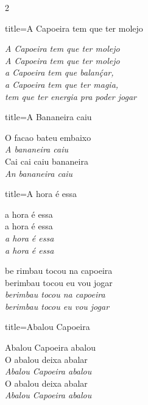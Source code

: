 \documentclass[fontsize=14pt, paper=a4, twoside, DIV=20]{scrreprt} %
\begin{document}
\begin{multicols*}{2}
\begin{song}{title={A Capoeira tem que ter molejo}}
\begin{verse*}
    \textit{A Capoeira tem que ter molejo \\
    A Capoeira tem que ter molejo \\
    a Capoeira tem que balanḉar, \\
    a Capoeira tem que ter magia, \\
    tem que ter energia pra poder jogar \\}
\end{verse*}
\end{song}

\columnbreak
\begin{song}{title={A Bananeira caiu}}
\begin{verse*}
O facao bateu embaixo\\
\textit{A bananeira caiu} \\
Cai cai caiu bananeira \\
\textit{An bananeira caiu} \\
\end{verse*}
\end{song}
\columnbreak
\begin{song}{title={A hora é essa}}
    \begin{verse*}
        a hora é essa \\
        a hora é essa \\
        \textit{
            a hora é essa \\
            a hora é essa \\        }
    \end{verse*}
\begin{verse*}
 be rimbau tocou na capoeira \\
berimbau tocou eu vou jogar \\
\textit{berimbau tocou na capoeira \\
berimbau tocou eu vou jogar}
\end{verse*}


\end{song}

\begin{song}{title={Abalou Capoeira}}
\begin{verse*}
Abalou Capoeira abalou\\
O abalou deixa abalar\\
\textit{Abalou Capoeira abalou}\\
O abalou deixa abalar\\
\textit{Abalou Capoeira abalou}\\


\end{verse*}
\end{song}
\end{multicols*}
\end{document}
